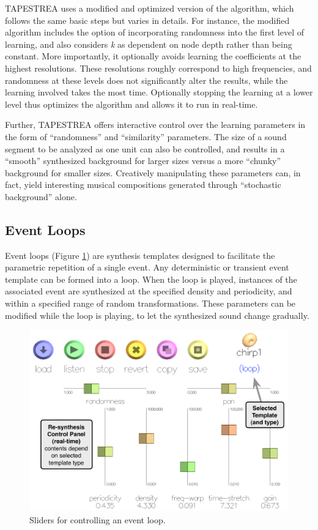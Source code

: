 \documentclass[10pt,letterpaper]{article}
\begin{document}
TAPESTREA uses a modified and optimized version of the algorithm, which
follows the same basic steps but varies in details. For instance,
the modified algorithm includes the option of incorporating randomness
into the first level of learning, and also considers \textit{k} as
dependent on node depth rather than being constant.  More
importantly, it optionally avoids learning the coefficients at the
highest resolutions. These resolutions roughly correspond to high
frequencies, and randomness at these levels does not significantly alter
the results, while the learning involved 
takes the most time. Optionally stopping the learning at a lower level
thus optimizes the algorithm and allows it to run in real-time. 

Further, TAPESTREA offers interactive control over the learning
parameters in the form of ``randomness'' and ``similarity'' parameters. The
size of a sound segment to be analyzed as one unit can also be
controlled, and results in a ``smooth'' synthesized background for larger
sizes versus a more ``chunky'' background for smaller sizes. Creatively
manipulating these parameters can, in fact, yield interesting musical compositions generated through ``stochastic background''
alone.

\subsection{Event Loops}

Event loops (Figure \ref{fig:ui_loop_params}) are synthesis templates
designed to facilitate the parametric repetition of a single event. Any
deterministic or transient event template can be formed into a loop.
When the loop is played, instances of the associated event are
synthesized at the specified density and periodicity, and within a
specified range of random transformations. These parameters can be
modified while the loop is playing, to let the synthesized sound change
gradually. 

\begin{figure}[h]
  \begin{center}
    \includegraphics[width=1\columnwidth]{ui_params.pdf}
    \caption{Sliders for controlling an event loop.} 
    \label{fig:ui_loop_params}
  \end{center}
\end{figure}
\end{document}
